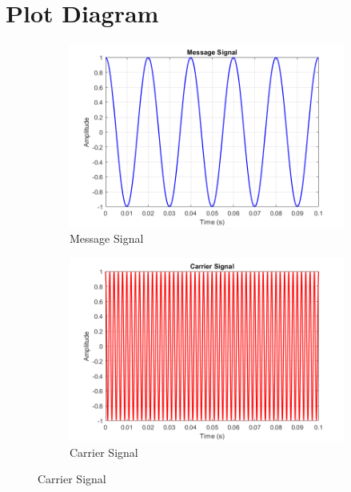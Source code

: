 \documentclass[a4paper,12pt]{article}
\begin{document}
\section{Plot Diagram}
\begin{figure}[H]
	\centering
	\begin{subfigure}[t]{0.49\textwidth}
		\centering
		\includegraphics[width=1\linewidth]{Images/1.1}
		\caption{Message Signal}
		\vspace{0.1cm}
	\end{subfigure}
	\hfil
	\begin{subfigure}[t]{0.49\textwidth}
		\centering
		\includegraphics[width=1\linewidth]{Images/2.2}
		\caption{ Carrier Signal}
	\end{subfigure}
	

\end{figure}
\end{document}

